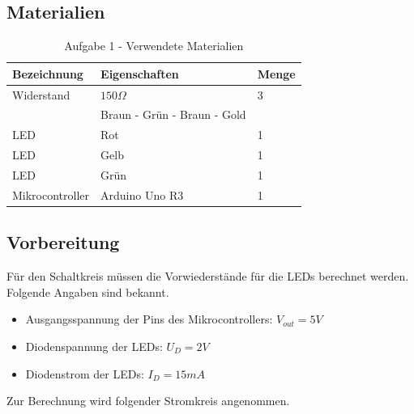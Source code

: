 \documentclass[11pt]{article}
\begin{document}
    \subsection{Materialien}
    \label{subsec:A1-materialien}

    \begin{table}[h]
        \centering
        \caption{Aufgabe 1 - Verwendete Materialien}
        \label{tab:a1-materialien}
        \begin{tabular}{| l | l | l |}
            \hline
            Bezeichnung & Eigenschaften & Menge \\
            \hline
            Widerstand  & $150\Omega$   & 3     \\
                        & Braun - Grün - Braun - Gold & \\
            LED & Rot & 1 \\
            LED & Gelb & 1 \\
            LED & Grün & 1 \\
            Mikrocontroller & Arduino Uno R3 & 1 \\
            \hline
        \end{tabular}
    \end{table}

    \subsection{Vorbereitung}
    \label{subsec:A1-vorbereitung}

    Für den Schaltkreis müssen die Vorwiederstände für die LEDs berechnet werden.
    Folgende Angaben sind bekannt.

    \begin{itemize}
        \item Ausgangsspannung der Pins des Mikrocontrollers: $V_{out} = 5V$
        \item Diodenspannung der LEDs: $U_D = 2V$
        \item Diodenstrom der LEDs: $I_D = 15mA$
    \end{itemize}

    Zur Berechnung wird folgender Stromkreis angenommen.
\end{document}
